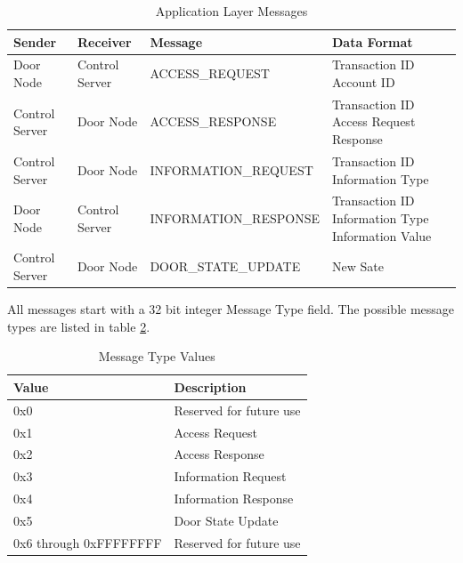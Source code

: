 \begin{table}[htb]
\begin{tabular}{ l | l | l | p{4.5cm} }
\toprule
Sender & Receiver & Message & Data Format\\
\midrule
Door Node & Control Server & ACCESS\_REQUEST &
Transaction ID \newline Account ID\\
\hline
Control Server & Door Node & ACCESS\_RESPONSE &
Transaction ID \newline Access Request Response\\
\hline
Control Server & Door Node & INFORMATION\_REQUEST &
Transaction ID \newline Information Type\\
\hline
Door Node & Control Server & INFORMATION\_RESPONSE &
Transaction ID \newline Information Type \newline Information Value\\
\hline
Control Server & Door Node & DOOR\_STATE\_UPDATE & New Sate\\
\bottomrule
\end{tabular}
\caption{Application Layer Messages}
\label{tab:app-layer-messages}
\end{table}

All messages start with a 32 bit integer Message Type field. The possible
message types are listed in table \ref{tab:message-types}.

\begin{table}[htb]
\centering
\begin{tabular}{@{}ll@{}}
\toprule
Value                   &   Description \\
\midrule
0x0                     &   Reserved for future use \\
0x1                     &   Access Request \\
0x2                     &   Access Response \\
0x3                     &   Information Request \\
0x4                     &   Information Response \\
0x5                     &   Door State Update \\
0x6 through 0xFFFFFFFF  &   Reserved for future use \\
\bottomrule
\end{tabular}
\caption{Message Type Values}
\label{tab:message-types}
\end{table}

